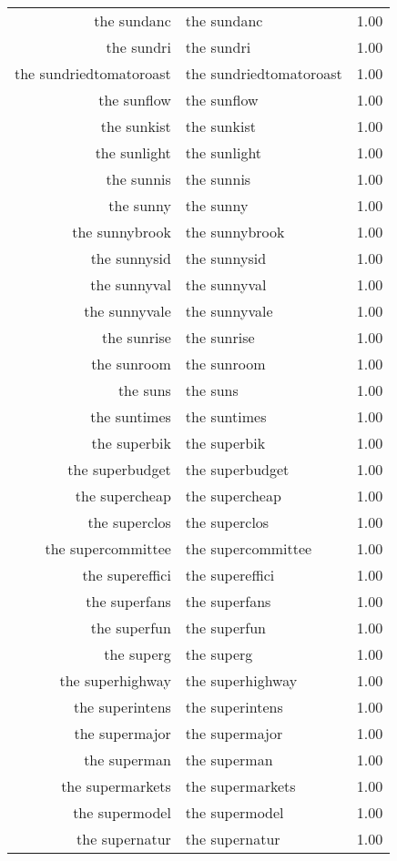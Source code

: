 \begin{table}[ht]
\begin{tabular}{rlr}
  the sundanc & the sundanc & 1.00 \\ 
  the sundri & the sundri & 1.00 \\ 
  the sundriedtomatoroast & the sundriedtomatoroast & 1.00 \\ 
  the sunflow & the sunflow & 1.00 \\ 
  the sunkist & the sunkist & 1.00 \\ 
  the sunlight & the sunlight & 1.00 \\ 
  the sunnis & the sunnis & 1.00 \\ 
  the sunny & the sunny & 1.00 \\ 
  the sunnybrook & the sunnybrook & 1.00 \\ 
  the sunnysid & the sunnysid & 1.00 \\ 
  the sunnyval & the sunnyval & 1.00 \\ 
  the sunnyvale & the sunnyvale & 1.00 \\ 
  the sunrise & the sunrise & 1.00 \\ 
  the sunroom & the sunroom & 1.00 \\ 
  the suns & the suns & 1.00 \\ 
  the suntimes & the suntimes & 1.00 \\ 
  the superbik & the superbik & 1.00 \\ 
  the superbudget & the superbudget & 1.00 \\ 
  the supercheap & the supercheap & 1.00 \\ 
  the superclos & the superclos & 1.00 \\ 
  the supercommittee & the supercommittee & 1.00 \\ 
  the supereffici & the supereffici & 1.00 \\ 
  the superfans & the superfans & 1.00 \\ 
  the superfun & the superfun & 1.00 \\ 
  the superg & the superg & 1.00 \\ 
  the superhighway & the superhighway & 1.00 \\ 
  the superintens & the superintens & 1.00 \\ 
  the supermajor & the supermajor & 1.00 \\ 
  the superman & the superman & 1.00 \\ 
  the supermarkets & the supermarkets & 1.00 \\ 
  the supermodel & the supermodel & 1.00 \\ 
  the supernatur & the supernatur & 1.00 \\ 

\end{tabular}
\end{table}
